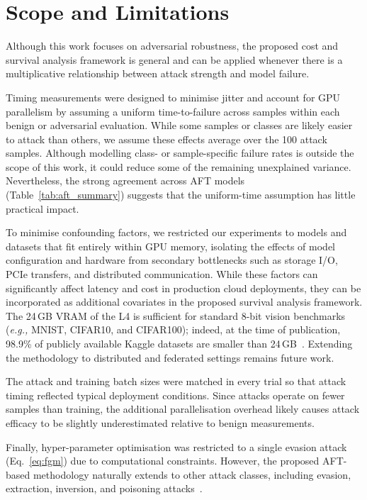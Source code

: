 \documentclass[conference]{IEEEtran}%
\begin{document}
\section{Scope and Limitations}
\label{considerations}

Although this work focuses on adversarial robustness, the proposed cost and survival analysis framework is general and can be applied whenever there is a multiplicative relationship between attack strength and model failure.

Timing measurements were designed to minimise jitter and account for GPU parallelism by assuming a uniform time-to-failure across samples within each benign or adversarial evaluation. 
While some samples or classes are likely easier to attack than others, we assume these effects average over the 100 attack samples. 
Although modelling class- or sample-specific failure rates is outside the scope of this work, it could reduce some of the remaining unexplained variance. 
Nevertheless, the strong agreement across AFT models (Table~\ref{tab:aft_summary}) suggests that the uniform-time assumption has little practical impact.

To minimise confounding factors, we restricted our experiments to models and datasets that fit entirely within GPU memory, isolating the effects of model configuration and hardware from secondary bottlenecks such as storage I/O, PCIe transfers, and distributed communication. 
While these factors can significantly affect latency and cost in production cloud deployments, they can be incorporated as additional covariates in the proposed survival analysis framework. 
The 24\,GB VRAM of the L4 is sufficient for standard 8-bit vision benchmarks (\textit{e.g.,} MNIST, CIFAR10, and CIFAR100); indeed, at the time of publication, 98.9\% of publicly available Kaggle datasets are smaller than 24\,GB~\cite{kagglehub}. 
Extending the methodology to distributed and federated settings remains future work.

The attack and training batch sizes were matched in every trial so that attack timing reflected typical deployment conditions. Since attacks operate on fewer samples than training, the additional parallelisation overhead likely causes attack efficacy to be slightly underestimated relative to benign measurements.

Finally, hyper-parameter optimisation was restricted to a single evasion attack (Eq.~\ref{eq:fgm}) due to computational constraints. 
However, the proposed AFT-based methodology naturally extends to other attack classes, including evasion, extraction, inversion, and poisoning attacks~\cite{carlini_towards_2017,biggio_poisoning_2013,choquette2021label,orekondy2019knockoff}.
\end{document}
